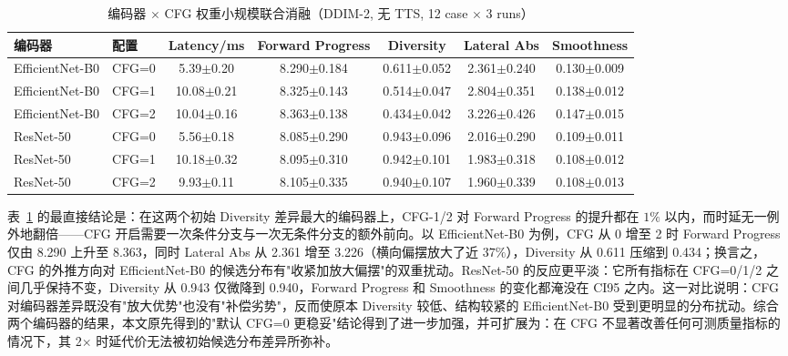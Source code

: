 \begin{table}[htbp]
    \centering
    \small
    \caption{编码器 $\times$ CFG 权重小规模联合消融（DDIM-2, 无 TTS, 12 case $\times$ 3 runs）}
    \label{tab:encoder-cfg-joint}
    \setlength{\tabcolsep}{3.5pt}
    \begin{tabular}{llccccc}
        \toprule
        编码器 & 配置 & Latency/ms & Forward Progress & Diversity & Lateral Abs & Smoothness \\
        \midrule
        EfficientNet-B0 & CFG=0 & 5.39$\pm$0.20 & 8.290$\pm$0.184 & 0.611$\pm$0.052 & 2.361$\pm$0.240 & 0.130$\pm$0.009 \\
        EfficientNet-B0 & CFG=1 & 10.08$\pm$0.21 & 8.325$\pm$0.143 & 0.514$\pm$0.047 & 2.804$\pm$0.351 & 0.138$\pm$0.012 \\
        EfficientNet-B0 & CFG=2 & 10.04$\pm$0.16 & 8.363$\pm$0.138 & 0.434$\pm$0.042 & 3.226$\pm$0.426 & 0.147$\pm$0.015 \\
        ResNet-50 & CFG=0 & 5.56$\pm$0.18 & 8.085$\pm$0.290 & 0.943$\pm$0.096 & 2.016$\pm$0.290 & 0.109$\pm$0.011 \\
        ResNet-50 & CFG=1 & 10.18$\pm$0.32 & 8.095$\pm$0.310 & 0.942$\pm$0.101 & 1.983$\pm$0.318 & 0.108$\pm$0.012 \\
        ResNet-50 & CFG=2 & 9.93$\pm$0.11 & 8.105$\pm$0.335 & 0.940$\pm$0.107 & 1.960$\pm$0.339 & 0.108$\pm$0.013 \\
        \bottomrule
    \end{tabular}
\end{table}

表~\ref{tab:encoder-cfg-joint} 的最直接结论是：在这两个初始 Diversity 差异最大的编码器上，CFG-1/2 对 Forward Progress 的提升都在 $1\%$ 以内，而时延无一例外地翻倍——CFG 开启需要一次条件分支与一次无条件分支的额外前向。以 EfficientNet-B0 为例，CFG 从 0 增至 2 时 Forward Progress 仅由 8.290 上升至 8.363，同时 Lateral Abs 从 2.361 增至 3.226（横向偏摆放大了近 $37\%$），Diversity 从 0.611 压缩到 0.434；换言之，CFG 的外推方向对 EfficientNet-B0 的候选分布有"收紧加放大偏摆"的双重扰动。ResNet-50 的反应更平淡：它所有指标在 CFG=0/1/2 之间几乎保持不变，Diversity 从 0.943 仅微降到 0.940，Forward Progress 和 Smoothness 的变化都淹没在 CI95 之内。这一对比说明：CFG 对编码器差异既没有"放大优势"也没有"补偿劣势"，反而使原本 Diversity 较低、结构较紧的 EfficientNet-B0 受到更明显的分布扰动。综合两个编码器的结果，本文原先得到的"默认 CFG=0 更稳妥"结论得到了进一步加强，并可扩展为：在 CFG 不显著改善任何可测质量指标的情况下，其 2$\times$ 时延代价无法被初始候选分布差异所弥补。

